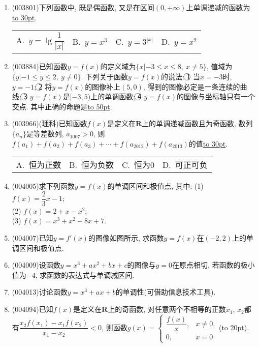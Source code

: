 \documentclass[10pt,a4paper]{article}
\newcommand{\blank}[1]{\underline{\hbox to #1pt{}}}
\newcommand{\bracket}[1]{(\hbox to #1pt{})}
\newcommand{\fourch}[4]{\par\begin{tabular}{p{.23\textwidth}p{.23\textwidth}p{.23\textwidth}p{.23\textwidth}}
A.~#1 &B.~#2& C.~#3& D.~#4
\end{tabular}}
\begin{document}
\begin{enumerate}[1.]
\item {\tiny (003801)}下列函数中, 既是偶函数, 又是在区间$(0,+\infty)$上单调递减的函数为\blank{30}.
\fourch{$y=\lg\dfrac{1}{|x|}$}{$y=x^3$}{$y=3^{|x|}$}{$y=x^2$}
\item {\tiny (003884)}已知函数$y=f(x)$的定义域为$\{x|-3\le x\le 8, \ x\ne 5\}$, 值域为$\{y|-1\le y\le 2, \ y\ne 0\}$. 下列关于函数$y=f(x)$的说法: \textcircled{1} 当$x=-3$时, $y=-1$; \textcircled{2} 将$y=f(x)$的图像补上$(5,0)$, 得到的图像必定是一条连续的曲线; \textcircled{3} $y=f(x)$是$[-3,5)$上的单调函数; \textcircled{4} $y=f(x)$的图像与坐标轴只有一个交点. 其中正确的命题是\blank{50}.
\item {\tiny (003966)}(理科)已知函数$f(x)$是定义在$\mathbf{R}$上的单调递减函数且为奇函数, 数列$\{a_n\}$是等差数列, $a_{1007}>0$, 则$f(a_1)+f(a_2)+f(a_3)+\cdots+f(a_{2012})+f(a_{2013})$的值\blank{30}.
\fourch{恒为正数}{恒为负数}{恒为$0$}{可正可负}
\item {\tiny (004005)}求下列函数$y=f(x)$的单调区间和极值点, 其中:
(1) $f(x)=\dfrac 23 x-1$;\\
(2) $f(x)=2+x-x^2$;\\
(3) $f(x)=x^3+x^2-8x+7$.
\item {\tiny (004007)}已知$y=f'(x)$的图像如图所示, 求函数$y=f(x)$在$(-2,2)$上的单调区间和极值点.
\begin{center}
\end{center}
\item {\tiny (004009)}设函数$y=x^3+ax^2+bx+c$的图像与$y=0$在原点相切, 若函数的极小值为$-4$, 求函数的表达式与单调减区间.
\item {\tiny (004013)}讨论函数$y=x^3+ax+b$的单调性(可借助信息技术工具).
\item {\tiny (004094)}已知$f(x)$是定义在$\mathbf{R}$上的奇函数, 对任意两个不相等的正数$x_1$, $x_2$都有$\dfrac{x_2f(x_1)-x_1f(x_2)}{x_1-x_2}<0$, 则函数$g(x)=\begin{cases} \dfrac{f(x)}x, &x\ne 0, \\ 0, & x=0 \end{cases}$\bracket{20}.

\end{enumerate}
\end{document}
